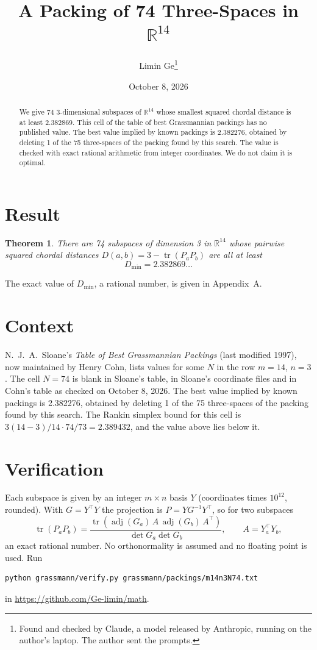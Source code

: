 \documentclass[11pt,a4paper]{article}
\title{A Packing of 74 Three-Spaces in $\mathbb{R}^{14}$}
\author{Limin Ge\thanks{Found and checked by Claude, a model released by Anthropic, running on the author's laptop. The author sent the prompts.}}
\date{October 8, 2026}
\newtheorem*{theorem}{Theorem}
\begin{document}
\maketitle
\begin{abstract}
We give 74 3-dimensional subspaces of $\mathbb{R}^{14}$ whose smallest squared chordal distance is at least 2.382869. This cell of the table of best Grassmannian packings has no published value. The best value implied by known packings is 2.382276, obtained by deleting 1 of the 75 three-spaces of the packing found by this search. The value is checked with exact rational arithmetic from integer coordinates. We do not claim it is optimal.
\end{abstract}

\section{Result}
\begin{theorem}
There are 74 subspaces of dimension 3 in $\mathbb{R}^{14}$ whose pairwise squared chordal distances $D(a,b) = 3 - \operatorname{tr}(P_aP_b)$ are all at least
\[ D_{\min} = 2.382869\ldots \]
\end{theorem}
The exact value of $D_{\min}$, a rational number, is given in Appendix~A.


\section{Context}
N.~J.~A.~Sloane's \emph{Table of Best Grassmannian Packings} (last modified 1997), now maintained by Henry Cohn, lists values for some $N$ in the row $m=14$, $n=3$. The cell $N=74$ is blank in Sloane's table, in Sloane's coordinate files and in Cohn's table as checked on October 8, 2026. The best value implied by known packings is 2.382276, obtained by deleting 1 of the 75 three-spaces of the packing found by this search. The Rankin simplex bound for this cell is $3(14-3)/14\cdot 74/73 = 2.389432$, and the value above lies below it.


\section{Verification}
Each subspace is given by an integer $m\times n$ basis $Y$ (coordinates times $10^{12}$, rounded). With $G=Y^\top Y$ the projection is $P=YG^{-1}Y^\top$, so for two subspaces
\[ \operatorname{tr}(P_aP_b)=\frac{\operatorname{tr}(\operatorname{adj}(G_a)\,A\,\operatorname{adj}(G_b)\,A^\top)}{\det G_a\det G_b},\qquad A=Y_a^\top Y_b, \]
an exact rational number. No orthonormality is assumed and no floating point is used. Run
\begin{verbatim}
python grassmann/verify.py grassmann/packings/m14n3N74.txt
\end{verbatim}
in \url{https://github.com/Ge-limin/math}.
\end{document}
